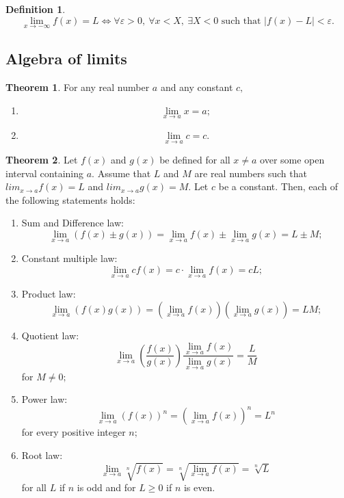 \documentclass[12pt, a4paper]{article}
\newcommand{\f}[2]{\frac{#1}{#2}}
\theoremstyle{definition}
\newtheorem{definition}{Definition}[section]
\newtheorem{theorem}{Theorem}[section]
\theoremstyle{plain}
\begin{document}
\begin{definition}
$$\lim_{x \to -\infty} f(x) = L \iff \forall \varepsilon>0, \ \forall x<X, \ \exists X<0 \text{ such that } |f(x)-L|<\varepsilon.$$
\end{definition}

\subsection{Algebra of limits}

\begin{theorem}
For any real number $a$ and any constant $c,$ \begin{enumerate}
	
	\item $$\lim_{x\to a}x=a;$$
	\item $$\lim_{x\to a}c=c.$$

\end{enumerate}
\end{theorem}

\begin{theorem}
Let $f(x)$ and $g(x)$ be defined for all $x \neq a$ over some open interval containing $a.$ Assume that $L$ and $M$ are real numbers such that $lim_{x\to a} f(x) = L$ and $lim_{x\to a} g(x) = M.$ Let $c$ be a constant. Then, each of the following statements holds: \begin{enumerate}
	
	\item Sum and Difference law: $$\lim_{x\to a}(f(x)\pm g(x))=\lim_{x\to a} f(x)\pm \lim_{x\to a}g(x)=L \pm M;$$

	\item Constant multiple law: $$\lim_{x\to a} cf(x)=c \cdot \lim_{x\to a} f(x)=cL;$$

	\item Product law: $$\lim_{x\to a} (f(x)g(x))=\left(\lim_{x\to a} f(x)\right)\left(\lim_{x\to a} g(x)\right)=LM;$$

	\item Quotient law: $$\lim_{x\to a}\left(\f{f(x)}{g(x)}\right)\f{\lim_{x\to a}f(x)}{\lim_{x\to a}g(x)}=\f{L}{M}$$ for $M\neq 0;$

	\item Power law: $$\lim_{x\to a} (f(x))^n=\left(\lim_{x\to a}f(x)\right)^n=L^n$$ for every positive integer $n;$

	\item Root law: $$\lim_{x\to a}\sqrt[n]{f(x)}=\sqrt[n]{\lim_{x\to a} f(x)}=\sqrt[n]{L}$$ for all $L$ if $n$ is odd and for $L\geq 0$ if $n$ is even.

\end{enumerate}
\end{theorem}
\end{document}
